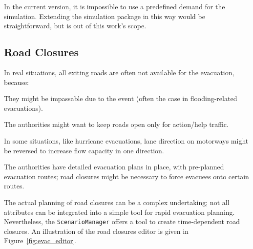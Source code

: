 In the current version, it is impossible to use a predefined demand for the simulation. Extending the simulation package in this way would be straightforward, but is out of this work's scope.

\subsection{Road Closures}
In real situations, all exiting roads are often not available for the evacuation, because:
\begin{compactitem}
\item They might be impassable due to the event (often the case in flooding-related evacuations).
\item The authorities might want to keep roads open only for action/help traffic.
\item In some situations, like hurricane evacuations, lane direction on motorways might be reversed to increase flow capacity in one direction.
\item The authorities have detailed evacuation plans in place, with pre-planned evacuation routes; road closures might be necessary to force evacuees onto certain routes.
\end{compactitem}
The actual planning of road closures can be a complex undertaking; not all attributes can be integrated into a simple tool for rapid evacuation planning. Nevertheless, the \lstinline|ScenarioManager| offers a tool to create time-dependent road closures. An illustration of the road closures editor is given in Figure~\ref{fig:evac_editor}.

